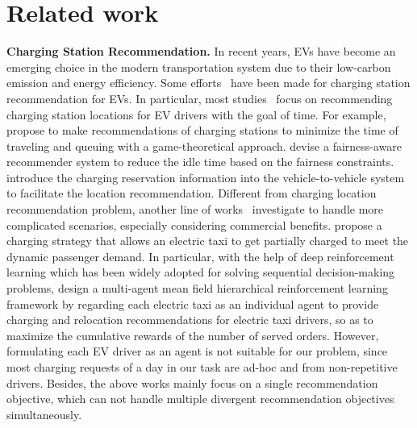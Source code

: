 \documentclass[sigconf]{acmart}
\begin{document}
\section{Related work}\label{sec:related}
\noindent \textbf{Charging Station Recommendation.}
In recent years, EVs have become an emerging choice in the modern transportation system due to their low-carbon emission and energy efficiency. Some efforts~\cite{cao2019toward,guo2017recommendation,kong2016line,tian2016real,wang2018bcharge,wang2019tcharge,wang2020faircharge,wang2020joint,yuan2019p} have been made for charging station recommendation for EVs.
%
In particular, most studies~\cite{wang2020faircharge,guo2017recommendation,tian2016real,wang2019tcharge,cao2019toward} focus on recommending charging station locations for EV drivers with the goal of time.
For example, \citet{guo2017recommendation} propose to make recommendations of charging stations to minimize the time of traveling and queuing with a game-theoretical approach.
\citet{wang2020faircharge} devise a fairness-aware recommender system to reduce the idle time based on the fairness constraints.
\citet{cao2019toward} introduce the charging reservation information into the vehicle-to-vehicle system to facilitate the location recommendation. %
%
Different from charging location recommendation problem, another line of works~\cite{yuan2019p,kong2016line,wang2018bcharge,wang2020joint} investigate to handle more complicated scenarios, especially considering commercial benefits.
\citet{yuan2019p} propose a charging strategy that allows an electric taxi to get partially charged to meet the dynamic passenger demand.
In particular, with the help of deep reinforcement learning which has been widely adopted for solving sequential decision-making problems, \citet{wang2020joint} design a multi-agent mean field hierarchical reinforcement learning framework by regarding each electric taxi as an individual agent to provide charging and relocation recommendations for electric taxi drivers, so as to maximize the cumulative rewards of the number of served orders. However, formulating each EV driver as an agent is not suitable for our problem, since most charging requests of a day in our task are ad-hoc and from non-repetitive drivers.
Besides, the above works mainly focus on a single recommendation objective, which can not handle multiple divergent recommendation objectives simultaneously.
\end{document}
